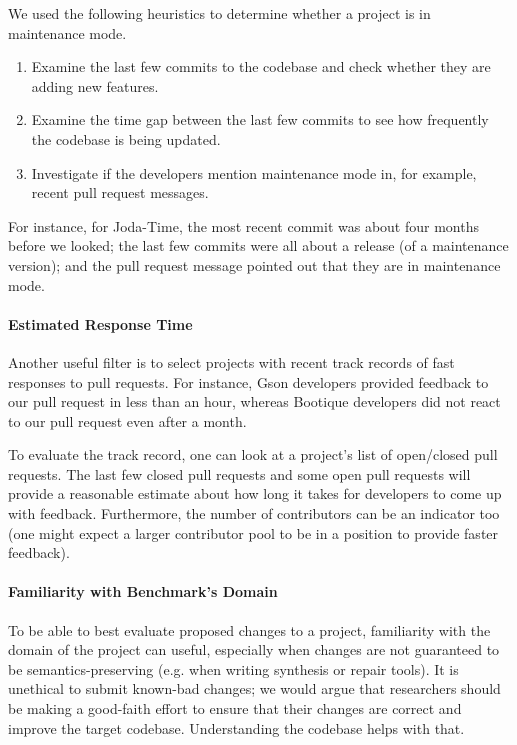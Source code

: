 We used the following heuristics to determine whether a project is in maintenance mode.
\begin{enumerate}
  \item Examine the last few commits to the codebase and check whether they are adding new features.
  \item Examine the time gap between the last few commits to see how frequently the codebase is being updated.
  \item Investigate if the developers mention maintenance mode in, for example, recent pull request messages.
\end{enumerate}

For instance, for Joda-Time, the most recent commit was about four months before we looked; the last few commits were all about a release (of a maintenance version); and the pull request message pointed out that they are in maintenance mode.

\paragraph{Estimated Response Time}
Another useful filter is to select projects with recent track records of fast responses to pull requests. For instance, Gson developers provided feedback to our pull request in less than an hour, whereas Bootique developers did not react to our pull request even after a month.

To evaluate the track record, one can look at a project's list of open/closed pull requests. The last few closed pull requests and some open pull requests will provide a reasonable estimate about how long it takes for developers to come up with feedback. Furthermore, the number of contributors can be an indicator too (one might expect a larger contributor pool to be in a position to provide faster feedback).

\paragraph{Familiarity with Benchmark's Domain}
To be able to best evaluate proposed changes to a project, familiarity with the domain of the project can useful, especially when changes are not guaranteed to be semantics-preserving (e.g. when writing synthesis or repair tools). It is unethical to submit known-bad changes; we would argue that researchers should be making a good-faith effort to ensure that their changes are correct and improve the target codebase. Understanding the codebase helps with that.

